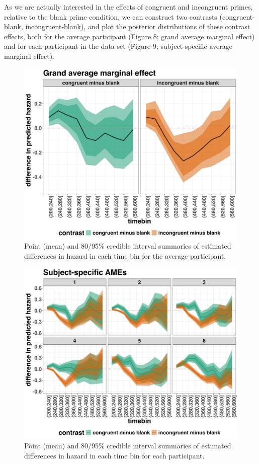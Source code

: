 \documentclass[
  man, donotrepeattitle,floatsintext]{apa6}
\begin{document}
As we are actually interested in the effects of congruent and incongruent primes, relative to the blank prime condition, we can construct two contrasts (congruent-blank, incongruent-blank), and plot the posterior distributions of these contrast effects, both for the average participant (Figure 8; grand average marginal effect) and for each participant in the data set (Figure 9; subject-specific average marginal effect).



\begin{figure}[H]

{\centering \includegraphics[width=0.8\linewidth,height=0.67\textheight,]{../Tutorial_2_Bayesian/figures/M1i_grand_AME} 

}

\caption{Point (mean) and 80/95\% credible interval summaries of estimated differences in hazard in each time bin for the average participant.}\label{fig:plot-grand-ame-effects}
\end{figure}



\begin{figure}[H]

{\centering \includegraphics[width=0.8\linewidth,height=0.67\textheight,]{../Tutorial_2_Bayesian/figures/M1i_pid_AMEs} 

}

\caption{Point (mean) and 80/95\% credible interval summaries of estimated differences in hazard in each time bin for each participant.}\label{fig:plot-pid-ame-effects}
\end{figure}
\end{document}
